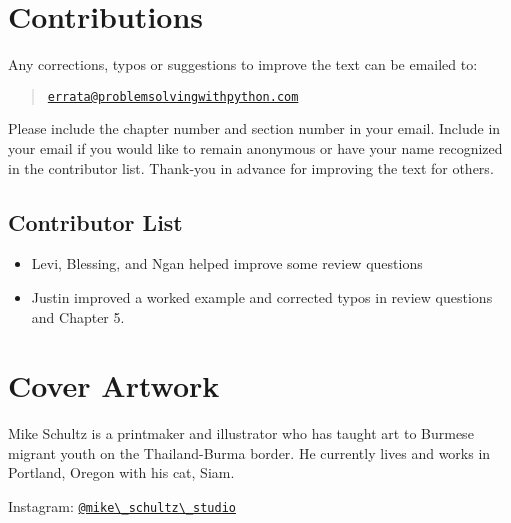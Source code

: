 \documentclass{book}
\newcommand{\passthrough}[1]{#1}
\begin{document}
    
        \hypertarget{contributions}{%
\section{Contributions}\label{contributions}}
    




    
        Any corrections, typos or suggestions to improve the text can be emailed
to:

\begin{quote}
\href{mailto:errata@problemsolvingwithpython.com}{\nolinkurl{errata@problemsolvingwithpython.com}}
\end{quote}

Please include the chapter number and section number in your email.
Include in your email if you would like to remain anonymous or have your
name recognized in the contributor list. Thank-you in advance for
improving the text for others.
    




    
        \hypertarget{contributor-list}{%
\subsection{Contributor List}\label{contributor-list}}

\begin{itemize}
\item
  Levi, Blessing, and Ngan helped improve some review questions
\item
  Justin improved a worked example and corrected typos in review
  questions and Chapter 5.
\end{itemize}
    




    
        \hypertarget{cover-artwork}{%
\section{Cover Artwork}\label{cover-artwork}}
    




    
        Mike Schultz is a printmaker and illustrator who has taught art to
Burmese migrant youth on the Thailand-Burma border. He currently lives
and works in Portland, Oregon with his cat, Siam.

Instagram:
\href{https://www.instagram.com/mike_schultz_studio/}{\passthrough{\lstinline!@mike\_schultz\_studio!}}
\end{document}
